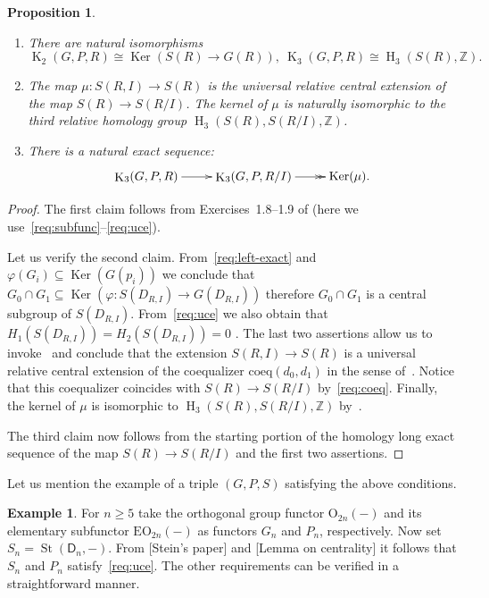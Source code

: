 \documentclass[oneside, 8pt]{amsart}
\newtheorem{prop}{Proposition}
\theoremstyle{remark}
\theoremstyle{definition}
\newtheorem{example}[lemma]{Example} \Crefname{example}{Example}{Examples}
\DeclareMathOperator{\Ker}{Ker}
\DeclareMathOperator{\St}{St}
\DeclareMathOperator{\HH}{H}
\DeclareMathOperator{\K}{K}
\newcommand{\ZZ}{\mathbb{Z}}
\newcommand{\rD}{\mathsf{D}}
\numberwithin{equation}{section}
\begin{document}
\begin{prop}\label{characterization}
\begin{enumerate}
 \item There are natural isomorphisms
  \[ \K_2(G, P, R) \cong \Ker(S(R) \to G(R)), \ \K_3(G, P, R) \cong \HH_3(S(R), \ZZ). \]
 \item The map $\mu \colon S(R, I) \to S(R)$ is the universal relative central extension of 
    the map $S(R) \to S(R/I)$. The kernel of $\mu$ is naturally isomorphic to the third relative homology group $\HH_3(S(R), S(R/I), \ZZ)$.
 \item There is a natural exact sequence:
 \[ \xymatrix{\K_3(G, P, R) \ar[r] & \K_3(G, P, R/I) \ar@{->>}[r] & \Ker(\mu).} \]
 \end{enumerate}   
\end{prop}
\begin{proof}
 The first claim follows from Exercises~1.8--1.9 of \cite[Chapter~IV]{Kbook} (here we use~\eqref{req:subfunc}--\eqref{req:uce}). %
 
 Let us verify the second claim. From~\eqref{req:left-exact} and $\varphi(G_i) \subseteq \Ker(G(p_i))$ we conclude that $G_0 \cap G_1 \subseteq \Ker(\varphi \colon S(D_{R, I}) \to G(D_{R, I}))$
  therefore $G_0 \cap G_1$ is a central subgroup of $S(D_{R, I})$.
 From~\eqref{req:uce} we also obtain that $H_1(S(D_{R,I})) = H_2(S(D_{R,I})) = 0$ .
 The last two assertions allow us to invoke~\cite[Proposition~6]{Lo78} and conclude that the extension $S(R, I) \to S(R)$ is a universal relative central extension of the coequalizer $\mathrm{coeq}(d_0, d_1)$
  in the sense of~\cite[\S~3]{Lo78}. 
 Notice that this coequalizer coincides with $S(R) \to S(R/I)$ by~\eqref{req:coeq}. 
 Finally, the kernel of $\mu$ is isomorphic to $\HH_3(S(R), S(R/I), \ZZ)$ by~\cite[Th{\'e}or{\`e}me~2]{Lo78}.
 
 The third claim now follows from the starting portion of the homology long exact sequence of the map $S(R) \to S(R/I)$ and the first two assertions.
\end{proof}

Let us mention the example of a triple $(G,P,S)$ satisfying the above conditions.
\begin{example} \label{ex:orth}
 For $n \geq 5$ take the orthogonal group functor $\mathrm{O}_{2n}(-)$ and its elementary subfunctor $\mathrm{EO}_{2n}(-)$ as functors $G_n$ and $P_n$, respectively.
 Now set $S_n = \St(\rD_n, -)$.
 From [Stein's paper] and [Lemma on centrality] it follows that $S_n$ and $P_n$ satisfy~\eqref{req:uce}.
 The other requirements can be verified in a straightforward manner.
\end{example}
\end{document}
